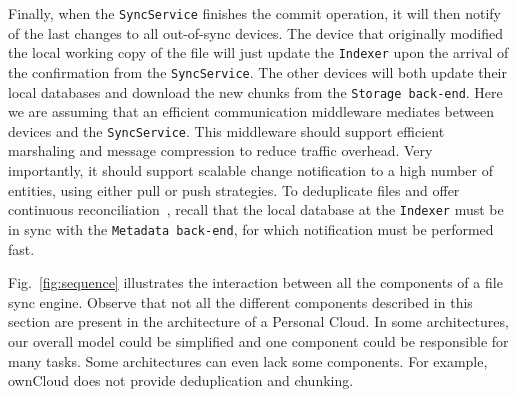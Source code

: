 Finally, when the \texttt{SyncService} finishes the commit operation, it will then notify of the last changes
to all out-of-sync devices. The device that originally modified the local working copy of the file will just
update the \texttt{Indexer} upon the arrival of the confirmation from the \texttt{SyncService}. 
The other devices will both update their local databases and download the new chunks from the \texttt{Storage back-end}. 
Here we are assuming that an efficient communication middleware mediates between devices and 
the \texttt{SyncService}. This middleware should support efficient marshaling and message
compression to reduce traffic overhead. Very importantly, it should support scalable change notification
to a high number of entities, using either pull or push strategies. To deduplicate files and offer continuous
reconciliation~\cite{Balasubramaniam98}, recall that the local database at the \texttt{Indexer} must
be in sync with the \texttt{Metadata back-end}, for which notification must be performed fast.

Fig.~\ref{fig:sequence} illustrates the interaction between all the components of a file sync
engine. Observe that not all the different components described in this section are present in the
architecture of a Personal Cloud. In some architectures, our overall model could be simplified and
one component could be responsible for many tasks. Some architectures can even lack some components. 
For example, ownCloud does not provide deduplication and chunking.